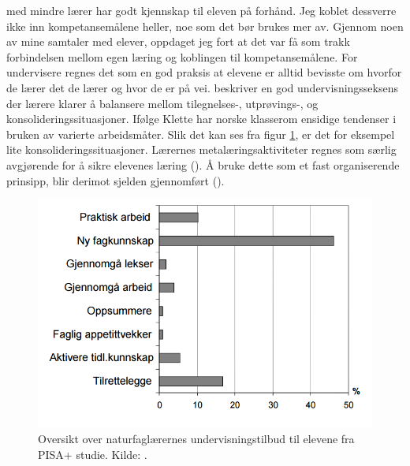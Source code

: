 \documentclass[main.tex]{subfiles}
\begin{document}
med mindre lærer har godt kjennskap til eleven på forhånd. Jeg koblet dessverre ikke inn kompetansemålene heller, 
noe som det bør brukes mer av. Gjennom noen av mine samtaler med elever, oppdaget jeg fort at det var få som trakk 
forbindelsen mellom egen læring og koblingen til kompetansemålene. For undervisere regnes det som en god praksis at 
elevene er alltid bevisste om hvorfor de lærer det de lærer og hvor de er på vei.  beskriver 
en god undervisningsseksens der lærere klarer å balansere mellom tilegnelses-, utprøvings-, og 
konsolideringssituasjoner. Ifølge Klette har norske klasserom ensidige tendenser i bruken av varierte arbeidsmåter. 
Slik det kan ses fra figur \ref{fig:odeg10}, er det for eksempel lite konsolideringssituasjoner. Lærernes 
metalæringsaktiviteter regnes som særlig avgjørende for å sikre elevenes læring (). Å bruke 
dette som et fast organiserende prinsipp, blir derimot sjelden gjennomført ().
\begin{figure}[h!]
\includegraphics[scale = 0.6]{../figures/undervisnings_aktivitet.png}
\caption{Oversikt over naturfaglærernes undervisningstilbud til elevene fra PISA+ studie. Kilde: 
\protect{}.}
\label{fig:odeg10}
\end{figure}
\end{document}
